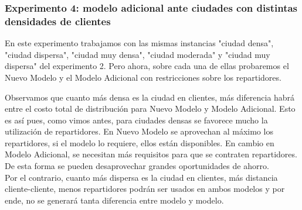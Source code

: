 \documentclass{article}
\begin{document}
    \subsubsection{Experimento 4: modelo adicional ante ciudades con distintas densidades de clientes}

    En este experimento trabajamos con las mismas instancias "ciudad densa", "ciudad dispersa", "ciudad muy densa", "ciudad moderada" y "ciudad muy dispersa" del experimento 2. Pero ahora, sobre cada una de ellas probaremos el Nuevo Modelo y el Modelo Adicional con restricciones sobre los repartidores.

    \begin{table}[H]
    \centering
    \caption{Comparación de costos entre metodologías para distintas densidades de clientes por $km^{2}$}
    \end{table}

    Observamos que cuanto más densa es la ciudad en clientes, más diferencia habrá entre el costo total de distribución para Nuevo Modelo y Modelo Adicional. Esto es así pues, como vimos antes, para ciudades densas se favorece mucho la utilización de repartidores. En Nuevo Modelo se aprovechan al máximo los repartidores, si el modelo lo requiere, ellos están disponibles. En cambio en Modelo Adicional, se necesitan más requisitos para que se contraten repartidores. De esta forma se pueden desaprovechar grandes oportunidades de ahorro. \\
    Por el contrario, cuanto más dispersa es la ciudad en clientes, más distancia cliente-cliente, menos repartidores podrán ser usados en ambos modelos y por ende, no se generará tanta diferencia entre modelo y modelo.
\end{document}

